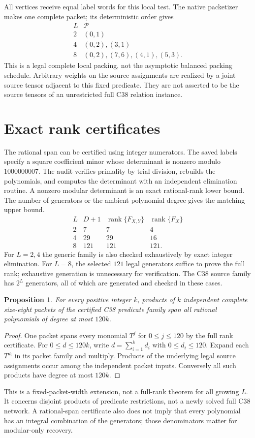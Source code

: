 \documentclass[11pt]{article}
\newtheorem{proposition}{Proposition}
\begin{document}
All vertices receive equal label words for this local test. The native
packetizer makes one complete packet; its deterministic order gives
\[
 \begin{array}{c|l}
 L&\mathcal P\\\hline
 2&(0,1)\\
 4&(0,2),(3,1)\\
 8&(0,2),(7,6),(4,1),(5,3).
 \end{array}
\]
This is a legal complete local packing, not the asymptotic balanced
packing schedule. Arbitrary weights on the source assignments are
realized by a joint source tensor adjacent to this fixed predicate.
They are not asserted to be the source tensors of an unrestricted
full C38 relation instance.

\section{Exact rank certificates}
The rational span can be certified using integer numerators.
The saved labels specify a square coefficient minor whose determinant
is nonzero modulo $1000000007$. The audit verifies primality by trial
division, rebuilds the polynomials, and computes the determinant with
an independent elimination routine. A nonzero modular determinant is
an exact rational-rank lower bound. The number of generators or the
ambient polynomial degree gives the matching upper bound.
\[
 \begin{array}{c|r|r|r}
 L&D+1&\operatorname{rank}\{F_{X,Y}\}&
                    \operatorname{rank}\{F_X\}\\\hline
 2&7&7&4\\
 4&29&29&16\\
 8&121&121&121.
 \end{array}
\]
For $L=2,4$ the generic family is also checked exhaustively by exact
integer elimination. For $L=8$, the selected $121$ legal generators
suffice to prove the full rank; exhaustive generation is unnecessary
for verification. The C38 source family has $2^L$ generators, all of
which are generated and checked in these cases.

\begin{proposition}
For every positive integer $k$, products of $k$ independent complete
size-eight packets of the certified C38 predicate family span all
rational polynomials of degree at most $120k$.
\end{proposition}
\begin{proof}
One packet spans every monomial $T^j$ for $0\le j\le120$ by the full
rank certificate. For $0\le d\le120k$, write $d=\sum_{i=1}^k d_i$
with $0\le d_i\le120$. Expand each $T^{d_i}$ in its packet family and
multiply. Products of the underlying legal source assignments occur
among the independent packet inputs. Conversely all such products
have degree at most $120k$.
\end{proof}
This is a fixed-packet-width extension, not a full-rank theorem for all
growing $L$. It concerns disjoint products of predicate restrictions,
not a newly solved full C38 network. A rational-span certificate also
does not imply that every polynomial has an integral combination of
the generators; those denominators matter for modular-only recovery.
\end{document}
